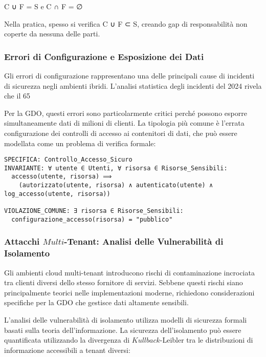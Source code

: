 {C ∪ F = S e C ∩ F = ∅

Nella pratica, spesso si verifica C ∪ F ⊂ S, creando gap di responsabilità non coperte da nessuna delle parti.

\subsubsection{Errori di Configurazione e Esposizione dei Dati}

Gli errori di configurazione rappresentano una delle principali cause di incidenti di sicurezza negli ambienti ibridi. L'analisi statistica degli incidenti del 2024 rivela che il 65%

Per la GDO, questi errori sono particolarmente critici perché possono esporre simultaneamente dati di milioni di clienti. La tipologia più comune è l'errata configurazione dei controlli di accesso ai contenitori di dati, che può essere modellata come un problema di verifica formale:

\begin{verbatim}
SPECIFICA: Controllo_Accesso_Sicuro
INVARIANTE: ∀ utente ∈ Utenti, ∀ risorsa ∈ Risorse_Sensibili:
  accesso(utente, risorsa) ⟹ 
    (autorizzato(utente, risorsa) ∧ autenticato(utente) ∧ log_accesso(utente, risorsa))

VIOLAZIONE_COMUNE: ∃ risorsa ∈ Risorse_Sensibili:
  configurazione_accesso(risorsa) = "pubblico"
\end{verbatim}

\subsubsection{Attacchi $Multi$-Tenant: Analisi delle Vulnerabilità di Isolamento}

Gli ambienti cloud multi-tenant introducono rischi di contaminazione incrociata tra clienti diversi dello stesso fornitore di servizi. Sebbene questi rischi siano principalmente teorici nelle implementazioni moderne, richiedono considerazioni specifiche per la GDO che gestisce dati altamente sensibili.

L'analisi delle vulnerabilità di isolamento utilizza modelli di sicurezza formali basati sulla teoria dell'informazione. La sicurezza dell'isolamento può essere quantificata utilizzando la divergenza di $Kullback$-Leibler tra le distribuzioni di informazione accessibili a tenant diversi:

}
